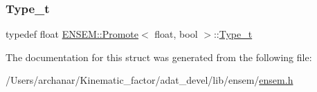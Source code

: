 \subsubsection{\texorpdfstring{Type\_t}{Type\_t}\hspace{0.1cm}{\footnotesize\ttfamily [2/2]}}
{\footnotesize\ttfamily typedef float \mbox{\hyperlink{structENSEM_1_1Promote}{E\+N\+S\+E\+M\+::\+Promote}}$<$ float, bool $>$\+::\mbox{\hyperlink{structENSEM_1_1Promote_3_01float_00_01bool_01_4_a6f3eae0e5a64ff95586a8924ebccb856}{Type\+\_\+t}}}



The documentation for this struct was generated from the following file\+:\begin{DoxyCompactItemize}
\item 
/\+Users/archanar/\+Kinematic\+\_\+factor/adat\+\_\+devel/lib/ensem/\mbox{\hyperlink{lib_2ensem_2ensem_8h}{ensem.\+h}}\end{DoxyCompactItemize}
